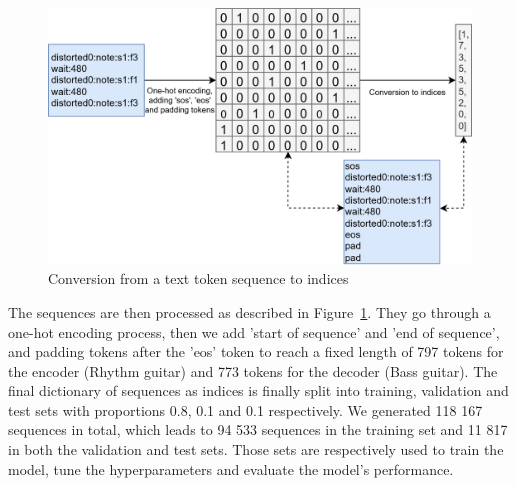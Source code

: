 \begin{figure}[!ht]
    \centering
    \includegraphics[width=.8\linewidth]{../images-figures/conversion_indices.png}
    \caption{Conversion from a text token sequence to indices}
    \label{fig:conversion_indices}
\end{figure}

The sequences are then processed as described in Figure~\ref{fig:conversion_indices}.
They go through a one-hot encoding process, then we add 'start of sequence' and 'end of sequence',
and padding tokens after the 'eos' token to reach a fixed length of 797 tokens for the encoder (Rhythm guitar) and 773 tokens for the decoder (Bass guitar).
The final dictionary of sequences as indices is finally split into training, validation and test sets with proportions 0.8, 0.1 and 0.1 respectively.
We generated 118 167 sequences in total, which leads to 94 533 sequences in the training set and 11 817 in both the validation and test sets.
Those sets are respectively used to train the model, tune the hyperparameters and evaluate the model's performance.

